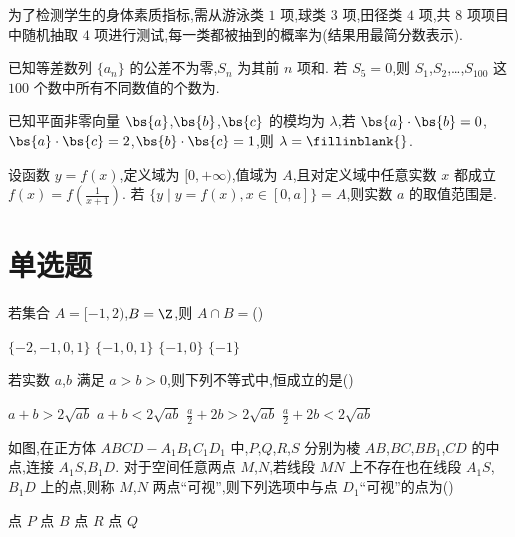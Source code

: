 \begin{problem}
为了检测学生的身体素质指标,需从游泳类 \(1\) 项,球类 \(3\) 项,田径类 \(4\) 项,共 \(8\) 项项目中随机抽取 \(4\) 项进行测试,每一类都被抽到的概率为\fillinblank{}(结果用最简分数表示).
\end{problem}

\begin{problem}
已知等差数列 \(\{a_n\}\) 的公差不为零,\(S_n\) 为其前 \(n\) 项和. 若 \(S_5=0\),则 \(S_1\),\(S_2\),\ldots,\(S_{100}\) 这 \(100\) 个数中所有不同数值的个数为\fillinblank{}.
\end{problem}

\begin{problem}
已知平面非零向量 \(\bs{a}\),\(\bs{b}\),\(\bs{c}\) 的模均为 \(\lambda\),若 \(\bs{a}\cdot\bs{b}=0\),\(\bs{a}\cdot\bs{c}=2\),\(\bs{b}\cdot\bs{c}=1\),则 \(\lambda=\fillinblank{}\).
\end{problem}

\begin{problem}
设函数 \(y=f(x)\),定义域为 \([0,+\infty)\),值域为 \(A\),且对定义域中任意实数 \(x\) 都成立 \(f(x)=f\left(\frac1{x+1}\right)\). 若 \(\{y\mid y=f(x),x\in[0,a]\}=A\),则实数 \(a\) 的取值范围是\fillinblank{}.
\end{problem}

\section{单选题}

\begin{problem}
若集合 \(A=[-1,2)\),\(B=\Z\),则 \(A\cap B=\)(\quad)

\choices
    {\(\{-2,-1,0,1\}\)}
    {\(\{-1,0,1\}\)}
    {\(\{-1,0\}\)}
    {\(\{-1\}\)}
\end{problem}

\begin{problem}
若实数 \(a\),\(b\) 满足 \(a>b>0\),则下列不等式中,恒成立的是(\quad)

\choices
    {\(a+b>2\sqrt{ab}\)}
    {\(a+b<2\sqrt{ab}\)}
    {\(\frac a2+2b>2\sqrt{ab}\)}
    {\(\frac a2+2b<2\sqrt{ab}\)}
\end{problem}

\begin{problem}
如图,在正方体 \(ABCD-A_1B_1C_1D_1\) 中,\(P\),\(Q\),\(R\),\(S\) 分别为棱 \(AB\),\(BC\),\(BB_1\),\(CD\) 的中点,连接 \(A_1S\),\(B_1D\). 对于空间任意两点 \(M\),\(N\),若线段 \(MN\) 上不存在也在线段 \(A_1S\),\(B_1D\) 上的点,则称 \(M\),\(N\) 两点``可视'',则下列选项中与点 \(D_1\)``可视''的点为(\quad)


\choices
    {点 \(P\)}
    {点 \(B\)}
    {点 \(R\)}
    {点 \(Q\)}
\end{problem}

